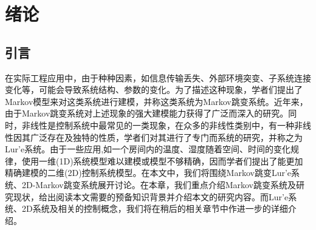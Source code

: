 
\chapter{绪论}
\section{引言}
	在实际工程应用中，由于种种因素，如信息传输丢失、外部环境突变、子系统连接变化等，可能会导致系统结构、参数的变化。为了描述这种现象，学者们提出了Markov模型来对这类系统进行建模，并称这类系统为Markov跳变系统。近年来，由于Markov跳变系统对上述现象的强大建模能力获得了广泛而深入的研究。同时，非线性是控制系统中最常见的一类现象，在众多的非线性类别中，有一种非线性因其广泛存在及独特的性质，学者们对其进行了专门而系统的研究，并称之为Lur'e系统。由于一些应用,如一个房间内的温度、湿度随着空间、时间的变化规律，使用一维(1D)系统模型难以建模或模型不够精确，因而学者们提出了能更加精确建模的二维(2D)控制系统模型。在本文中，我们将围绕Markov跳变Lur'e系统、2D-Markov跳变系统展开讨论。在本章，我们重点介绍Markov跳变系统及研究现状，给出阅读本文需要的预备知识背景并介绍本文的研究内容。而Lur'e系统、2D系统及相关的控制概念，我们将在稍后的相关章节中作进一步的详细介绍。

